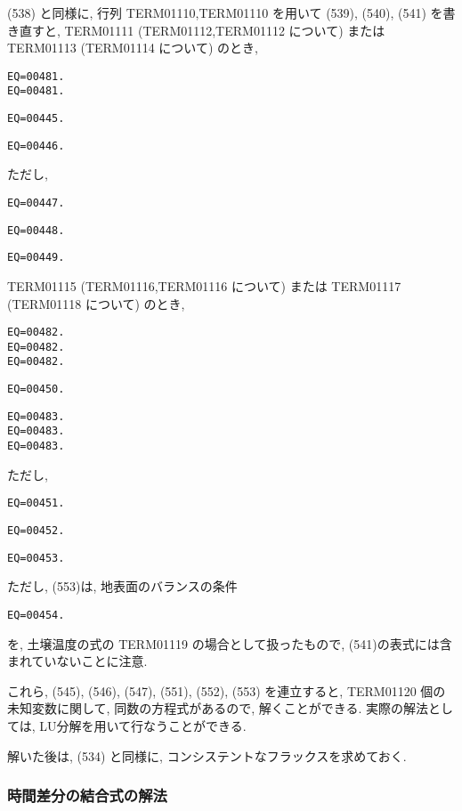 (538) と同様に, 行列 TERM01110,TERM01110 を用いて
(539), (540), (541) を書き直すと, 
%
 TERM01111 (TERM01112,TERM01112 について) または TERM01113 (TERM01114 について) のとき, 
%
  \begin{verbatim}
EQ=00481.
EQ=00481.
\end{verbatim}

\begin{verbatim}
EQ=00445.
\end{verbatim}

\begin{verbatim}
EQ=00446.
\end{verbatim}
%
ただし, 
\begin{verbatim}
EQ=00447.
\end{verbatim}
\begin{verbatim}
EQ=00448.
\end{verbatim}
\begin{verbatim}
EQ=00449.
\end{verbatim}

 TERM01115 (TERM01116,TERM01116 について) または TERM01117 (TERM01118 について) のとき, 
%
  \begin{verbatim}
EQ=00482.
EQ=00482.
EQ=00482.
\end{verbatim}
%
\begin{verbatim}
EQ=00450.
\end{verbatim}
%
\begin{verbatim}
EQ=00483.
EQ=00483.
EQ=00483.
\end{verbatim}
%
ただし, 
\begin{verbatim}
EQ=00451.
\end{verbatim}
\begin{verbatim}
EQ=00452.
\end{verbatim}
\begin{verbatim}
EQ=00453.
\end{verbatim}
%
ただし, (553)は, 地表面のバランスの条件
\begin{verbatim}
EQ=00454.
\end{verbatim}
を, 土壌温度の式の TERM01119 の場合として扱ったもので, 
(541)の表式には含まれていないことに注意. 

これら,
(545), (546), (547), 
(551), (552), (553)
を連立すると, TERM01120 個の未知変数に関して, 
同数の方程式があるので, 解くことができる.
実際の解法としては, LU分解を用いて行なうことができる.

解いた後は, 
(534) と同様に,
コンシステントなフラックスを求めておく.

\subsubsection{時間差分の結合式の解法}

